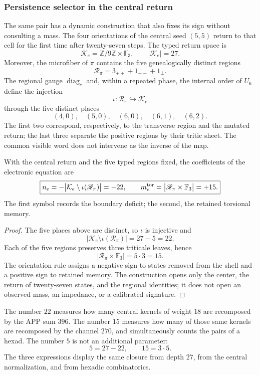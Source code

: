 \subsubsection{Persistence selector in the central return}

The same pair has a dynamic construction that also fixes its sign without
consulting a mass. The four orientations of the central seed
\((5,5)\) return to that cell for the first time after twenty-seven steps. The
typed return space is
\[
 \mathcal K_e=\mathbb Z/9\mathbb Z\times\mathbb F_3,
 \qquad |\mathcal K_e|=27.
\]
Moreover, the microfiber of \(\pi\) contains the five genealogically
distinct regions
\[
 \mathscr R_\pi=3_{++}+1_{--}+1_{\perp}.
\]
The regional gauge \(\operatorname{diag}_c\) and, within a repeated phase,
the internal order of \(U_6\) define the injection
\[
 \iota:\mathscr R_\pi\hookrightarrow\mathcal K_e
\]
through the five distinct places
\[
 (4,0),\quad(5,0),\quad(6,0),\quad(6,1),\quad(6,2).
\]
The first two correspond, respectively, to the transverse region and
the mutated return; the last three separate the positive regions by their
tritic sheet. The common visible word does not intervene as the inverse of the map.

\begin{theorem}
\label{thm:selector-persistencia-electron-rev7}
With the central return and the five typed regions fixed, the coefficients of
the electronic equation are
\[
 \boxed{
 n_e=-\bigl|\mathcal K_e\setminus\iota(\mathscr R_\pi)\bigr|=-22,
 \qquad
 m_e^{\rm tor}=\bigl|\mathscr R_\pi\times\mathbb F_3\bigr|=+15.}
\]
The first symbol records the boundary deficit; the second, the retained torsional memory.
\end{theorem}

\begin{proof}
The five places above are distinct, so \(\iota\) is
injective and
\[
 |\mathcal K_e\setminus\iota(\mathscr R_\pi)|=27-5=22.
\]
Each of the five regions preserves three triticale leaves, hence
\[
 |\mathscr R_\pi\times\mathbb F_3|=5\cdot3=15.
\]
The orientation rule assigns a negative sign to states removed from the
shell and a positive sign to retained memory. The construction opens only the
center, the return of twenty-seven states, and the regional identities; it does not
open an observed mass, an impedance, or a calibrated signature.
\end{proof}

The number \(22\) measures how many central kernels of weight \(18\) are recomposed by the
APP sum \(396\). The number \(15\) measures how many of those same kernels
are recomposed by the channel \(270\), and simultaneously counts the pairs of a
hexad. The number \(5\) is not an additional parameter:
\[
 5=27-22,\qquad 15=3\cdot5.
\]
The three expressions display the same closure from depth 27,
from the central normalization, and from hexadic combinatorics.

